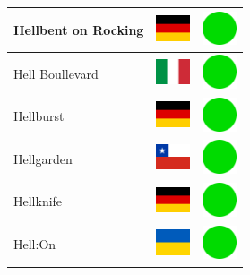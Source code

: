 \documentclass[12pt, a4paper, twoside]{report}
\begin{document}
\begin{center}
\begin{longtable}{|p{5cm}|p{2cm}|p{2cm}|}
 Hellbent on Rocking                                        & \includegraphics[width=1cm]{../4x3/de} &   \includegraphics[width=1cm]{../likes/y} \\ \hline
 Hell Boullevard                                            & \includegraphics[width=1cm]{../4x3/it} &   \includegraphics[width=1cm]{../likes/y} \\ \hline
 Hellburst                                                  & \includegraphics[width=1cm]{../4x3/de} &   \includegraphics[width=1cm]{../likes/y} \\ \hline
 Hellgarden                                                 & \includegraphics[width=1cm]{../4x3/cl} &   \includegraphics[width=1cm]{../likes/y} \\ \hline
 Hellknife                                                  & \includegraphics[width=1cm]{../4x3/de} &   \includegraphics[width=1cm]{../likes/y} \\ \hline
 Hell:On                                                    & \includegraphics[width=1cm]{../4x3/ua} &   \includegraphics[width=1cm]{../likes/y} \\ \hline

\end{longtable}
\end{center}
\end{document}
